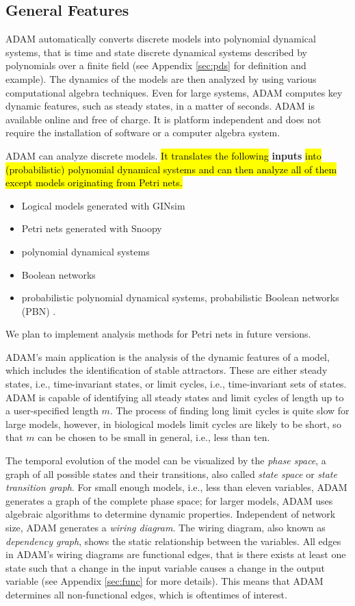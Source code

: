 \documentclass[10pt]{bmc_article}
\newenvironment{bmcformat}{\begin{raggedright}\baselineskip20pt\sloppy\setboolean{publ}{false}}{\end{raggedright}\baselineskip20pt\sloppy}
\begin{document}
\begin{bmcformat}
\subsection*{General Features}
ADAM automatically converts discrete models into polynomial dynamical systems,
that is time and state discrete dynamical systems described by polynomials
over a finite field (see Appendix \ref{sec:pds} for definition and example). The dynamics of the models are then analyzed by using various computational algebra
techniques. Even for large systems, ADAM computes key dynamic features, such
as steady states, in a matter of seconds. ADAM is available online and free of
charge. It is platform independent and does not require the installation of
software or a computer algebra system.

ADAM can analyze discrete models. \hl{It translates the following }{\bf inputs} \hl{into (probabilistic) polynomial dynamical systems and can then analyze all of them except models originating from Petri nets. }
\begin{itemize}
  \item Logical models generated with GINsim \cite{GINsim}
  \item Petri nets generated with Snoopy \cite{Snoopy}
  \item polynomial dynamical systems
  \item Boolean networks
  \item probabilistic polynomial dynamical systems, probabilistic Boolean networks (PBN) \cite{shmulevich}.
\end{itemize}
We plan to implement analysis methods for  Petri nets in future versions.

ADAM’s main application is the analysis of the dynamic features of a model, which includes the identification of stable attractors. These are either steady states, i.e.,
time-invariant states, or limit cycles, i.e., time-invariant sets of states. ADAM is capable of identifying all steady states and
limit cycles of length up to a user-specified length $m$. The process of
finding long limit cycles is quite slow for large models, however, in
biological models limit cycles are likely to be short, so that $m$ can be
chosen to be small in general, i.e., less than ten.

The temporal evolution of the model can be visualized by the {\it phase
space}, a graph of all possible states and their transitions, also called {\it state space} or {\it state transition graph}. For small enough
models, i.e., less than eleven variables, ADAM generates a graph of the complete phase space; for larger models, ADAM uses algebraic algorithms to determine dynamic properties. Independent of
network size, ADAM generates a {\it wiring diagram}. The wiring diagram, also
known as {\it dependency graph}, shows the static relationship between the
variables. All edges in ADAM’s wiring diagrams are functional edges, that is
there exists at least one state such that a change in the input variable causes a
change in the output variable (see Appendix \ref{sec:func} for more details).
This means that ADAM determines all non-functional edges, which is oftentimes
of interest.


\end{bmcformat}
\end{document}
